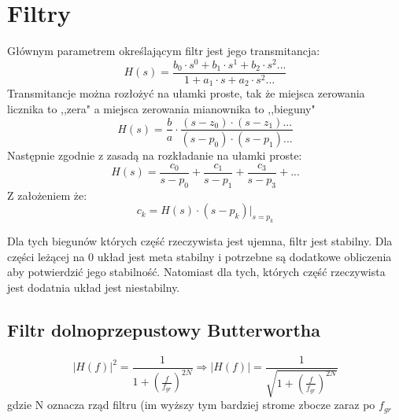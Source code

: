 \section{Filtry}
    Głównym parametrem określającym filtr jest jego transmitancja:
    \begin{equation*}
        H(s) = \frac{b_0\cdot s^0+b_1\cdot s^1+ b_2\cdot s^2...}{1+a_1\cdot s + a_2\cdot s^2...}
    \end{equation*}
    Transmitancje można rozłożyć na ułamki proste, tak że miejsca zerowania licznika to ,,zera" a miejsca zerowania mianownika to ,,bieguny"
    \begin{equation*}
        H(s) = \frac{b}{a}\cdot \frac{(s-z_0)\cdot(s-z_1)...}{(s-p_0)\cdot(s-p_1)...}
    \end{equation*}
    Następnie zgodnie z zasadą na rozkładanie na ułamki proste:
    \begin{equation*}
        H(s) = \frac{c_0}{s-p_0}+\frac{c_1}{s-p_1}+\frac{c_3}{s-p_3}+...
    \end{equation*}
    Z założeniem że:
    \begin{equation*}
        c_k = H(s)\cdot(s-p_k)\vert _{s = p_k}
    \end{equation*}

    \noindent Dla tych biegunów których część rzeczywista jest ujemna, filtr jest stabilny.
    Dla części leżącej na 0 układ jest meta stabilny i potrzebne są dodatkowe obliczenia aby potwierdzić jego stabilność.
    Natomiast dla tych, których część rzeczywista jest dodatnia układ jest niestabilny.


    \subsection{Filtr dolnoprzepustowy Butterwortha}
        \begin{equation*}
            |H(f)|^2 = \frac{1}{1+\left(\frac{f}{f_{gr}}\right)^{2N}} \Rightarrow |H(f)| = \frac{1}{\sqrt{1+\left(\frac{f}{f_{gr}}\right)^{2N}}}
        \end{equation*}
        gdzie N oznacza rząd filtru (im wyższy tym bardziej strome zbocze zaraz po $f_{gr}$

